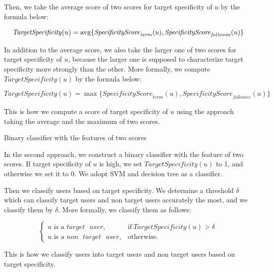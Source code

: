 Then, we take the average score of two scores for target specificity of
$u$ by the formula below:

\vspace{-4ex}
\[
 \mathit{TargetSpecificity}(u) = {\rm avg} \{
 \mathit{SpecificityScore}_{{\mathit{term}}}(u),
 \mathit{SpecificityScore}_{{\mathit{followee}}}(u)\}
\]
\vspace{-4ex}

In addition to the average score, we also take the larger one of two
scores for target specificity of $u$, because the larger one is supposed to
characterize target specificity more strongly than the other.  More
formally, we compute $\mathit{TargetSpecificity}(u)$ by the formula
below:

\vspace{-4ex}
\[
 \mathit{TargetSpecificity}(u) = \max \{
 \mathit{SpecificityScore}_{{\mathit{term}}}(u),
 \mathit{SpecificityScore}_{{\mathit{followee}}}(u)\}
\]
\vspace{-4ex}

This is how we compute a score of target specificity of $u$ using the
approach taking the average and the maximum of two scores.

\begin{description}
\bf{\item[(2)] Binary classifier with the features of two scores}
\label{item:Binary Classifier}
\end{description}

In the second approach, we construct a binary classifier with the feature of
two scores.  If target specificity of $u$ is high, we set
$\mathit{TargetSpecificity}(u)$ to 1, and otherwise we set it to 0.  We
adopt SVM and decision tree as a classifier.


Then we classify users based on target specificity.  We determine a
threshold $\delta$ which can classify target users and non target users
accurately the most, and we classify them by $\delta$.  More formally,
we classify them as follows:

\vspace{-1ex}
\[
\begin{cases}
u\mbox{ is a } \mathit{target}\mbox{ }\mathit{user}, & \mbox{if}\
\mathit{TargetSpecificity}(u) > \delta \\
u\mbox{ is a }\mathit{non}\mbox{ }\mathit{target}\mbox{ }\mathit{user}, & \mbox{otherwise}.
\end{cases}
\]
\vspace{-2ex}

This is how we classify users into target users and non target users
based on target specificity.
